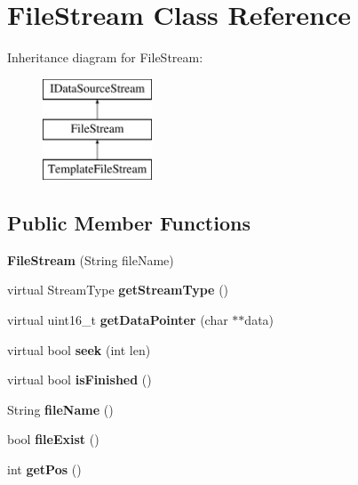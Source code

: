 \hypertarget{class_file_stream}{}\section{File\+Stream Class Reference}
\label{class_file_stream}
Inheritance diagram for File\+Stream\+:\begin{figure}[H]
\begin{center}
\leavevmode
\includegraphics[height=3.000000cm]{class_file_stream}
\end{center}
\end{figure}
\subsection*{Public Member Functions}
\begin{DoxyCompactItemize}
\item 
\hypertarget{class_file_stream_a4cd4eca5016e95f3ffb41a29b3214d41}{}{\bfseries File\+Stream} (String file\+Name)\label{class_file_stream_a4cd4eca5016e95f3ffb41a29b3214d41}

\item 
\hypertarget{class_file_stream_adfb9c8efcb62d6f2cc91ca4efbad718d}{}virtual Stream\+Type {\bfseries get\+Stream\+Type} ()\label{class_file_stream_adfb9c8efcb62d6f2cc91ca4efbad718d}

\item 
\hypertarget{class_file_stream_a49eff9c8d564f58a836c646a9c9ebe05}{}virtual uint16\+\_\+t {\bfseries get\+Data\+Pointer} (char $\ast$$\ast$data)\label{class_file_stream_a49eff9c8d564f58a836c646a9c9ebe05}

\item 
\hypertarget{class_file_stream_aef7c57fb24daebcddf60f62581e2b10b}{}virtual bool {\bfseries seek} (int len)\label{class_file_stream_aef7c57fb24daebcddf60f62581e2b10b}

\item 
\hypertarget{class_file_stream_ad090f9e130a0b3a9888844a61ab02f38}{}virtual bool {\bfseries is\+Finished} ()\label{class_file_stream_ad090f9e130a0b3a9888844a61ab02f38}

\item 
\hypertarget{class_file_stream_acf13ae992e4b99b244633dc8d592311b}{}String {\bfseries file\+Name} ()\label{class_file_stream_acf13ae992e4b99b244633dc8d592311b}

\item 
\hypertarget{class_file_stream_a34cab4c00d5b49e16aeffc84c34970f5}{}bool {\bfseries file\+Exist} ()\label{class_file_stream_a34cab4c00d5b49e16aeffc84c34970f5}

\item 
\hypertarget{class_file_stream_aca0218676383112bf4c034d98461f682}{}int {\bfseries get\+Pos} ()\label{class_file_stream_aca0218676383112bf4c034d98461f682}

\end{DoxyCompactItemize}


